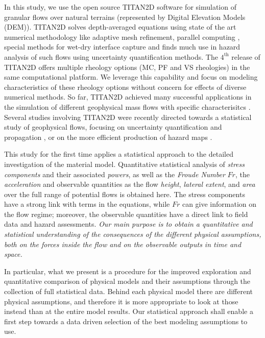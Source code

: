 \documentclass{article}
\begin{document}
In this study, we use the open source TITAN2D software for simulation of granular flows over natural terrains (represented by Digital Elevation Models (DEM)).  TITAN2D solves depth-averaged equations using
state of the art numerical methodology like adaptive mesh refinement, parallel computing  \citep{Pitman2003a, Patra2005, Patra2006, Yu2009}, special methods for wet-dry interface capture \citep{Aghakhani2016} and finds much use in hazard analysis of such flows using uncertainty quantification methods. The $\mathrm{4^{\mathrm{th}}}$ release of TITAN2D offers multiple rheology options (MC, PF and VS rheologies)  in the same computational platform. We leverage this capability and focus on modeling characteristics of these rheology options without concern for effects of diverse numerical methods. So far, TITAN2D achieved many successful applications in the simulation of different geophysical mass flows with specific characterisitcs \citep{Sheridan2005, Rupp2006, Norini2008, Charbonnier2009, Procter2010, Sheridan2010, Sulpizio2010, Capra2011}. Several studies involving TITAN2D were recently directed towards a statistical study of geophysical flows, focusing on uncertainty quantification and propagation \citep{Dalbey2008, Dalbey2009, Stefanescu2012b, Stefanescu2012a}, or on the more efficient production of hazard maps \citep{Bayarri2009, Spiller2014,Bayarri2015, Ogburn2016}.

This study for the first time applies a statistical approach to the detailed investigation of the material model. Quantitative statistical analysis of  \emph{stress components} and their associated \emph{powers}, as well as the \emph{Froude Number} $Fr$, the \emph{acceleration} and observable quantities as the flow \emph{height}, \emph{lateral extent}, and \emph{area} over the full range of potential flows is obtained here. The stress components have a strong link with  terms in the equations, while $Fr$ can give information on the flow regime; moreover, the observable quantities have a direct link to field data and hazard assessments. {\it Our main purpose is to obtain a quantitative and statistical understanding of the consequences of the different physical assumptions, both on the forces inside the flow and on the observable outputs in time and space.}

In particular, what we present is a procedure for the improved exploration and quantitative comparison of physical models and their assumptions through the collection of full statistical data. Behind each physical model there are different physical assumptions, and therefore it is more appropriate to look at those instead than at the entire model results. Our statistical approach shall enable a first step towards a data driven selection of the best modeling assumptions to use.
\end{document}
